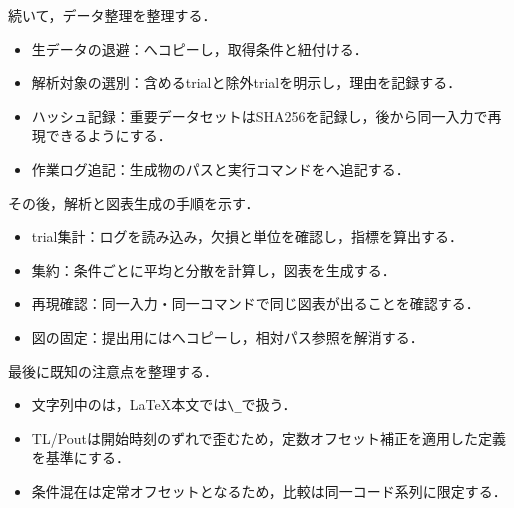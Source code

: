 続いて，データ整理を整理する．
\begin{itemize}
  \item 生データの退避：\texttt{}へコピーし，取得条件と紐付ける．
  \item 解析対象の選別：含めるtrialと除外trialを明示し，理由を記録する．
  \item ハッシュ記録：重要データセットはSHA256を記録し，後から同一入力で再現できるようにする．
  \item 作業ログ追記：生成物のパスと実行コマンドを\texttt{}へ追記する．
\end{itemize}

その後，解析と図表生成の手順を示す．
\begin{itemize}
  \item trial集計：ログを読み込み，欠損と単位を確認し，指標を算出する．
  \item 集約：条件ごとに平均と分散を計算し，図表を生成する．
  \item 再現確認：同一入力・同一コマンドで同じ図表が出ることを確認する．
  \item 図の固定：提出用には\texttt{}へコピーし，相対パス参照を解消する．
\end{itemize}

最後に既知の注意点を整理する．
\begin{itemize}
  \item 文字列中の\texttt{\detokenize{_}}は，LaTeX本文では\texttt{\textbackslash\_}で扱う．
  \item TL/Poutは開始時刻のずれで歪むため，定数オフセット補正を適用した定義を基準にする．
  \item 条件混在は定常オフセットとなるため，比較は同一コード系列に限定する．
\end{itemize}






